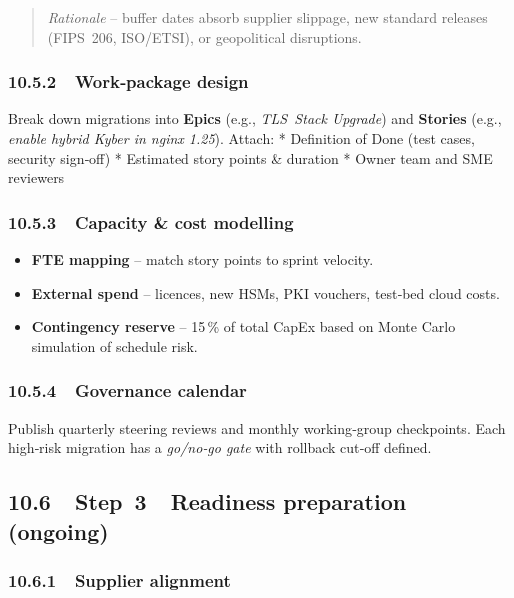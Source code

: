 \documentclass[
  english,
]{article}
\providecommand{\tightlist}{%
  \setlength{\itemsep}{0pt}\setlength{\parskip}{0pt}}
\begin{document}
\begin{quote}
\emph{Rationale} -- buffer dates absorb supplier slippage, new standard
releases (FIPS~206, ISO/ETSI), or geopolitical disruptions.
\end{quote}

\subsubsection{10.5.2~~Work‑package design}\label{workpackage-design}

Break down migrations into \textbf{Epics} (e.g., \emph{TLS~Stack
Upgrade}) and \textbf{Stories} (e.g., \emph{enable hybrid Kyber in nginx
1.25}). Attach: * Definition of Done (test cases, security sign‑off) *
Estimated story points \& duration * Owner team and SME reviewers

\subsubsection{10.5.3~~Capacity \& cost
modelling}\label{capacity-cost-modelling}

\begin{itemize}
\tightlist
\item
  \textbf{FTE mapping} -- match story points to sprint velocity.
\item
  \textbf{External spend} -- licences, new HSMs, PKI vouchers, test‑bed
  cloud costs.
\item
  \textbf{Contingency reserve} -- 15\,\% of total CapEx based on Monte
  Carlo simulation of schedule risk.
\end{itemize}

\subsubsection{10.5.4~~Governance calendar}\label{governance-calendar}

Publish quarterly steering reviews and monthly working‑group
checkpoints. Each high‑risk migration has a \emph{go/no‑go gate} with
rollback cut‑off defined.

\subsection{10.6~~Step~3~~Readiness preparation
(ongoing)}\label{step-3-readiness-preparation-ongoing}

\subsubsection{10.6.1~~Supplier alignment}\label{supplier-alignment}
\end{document}
